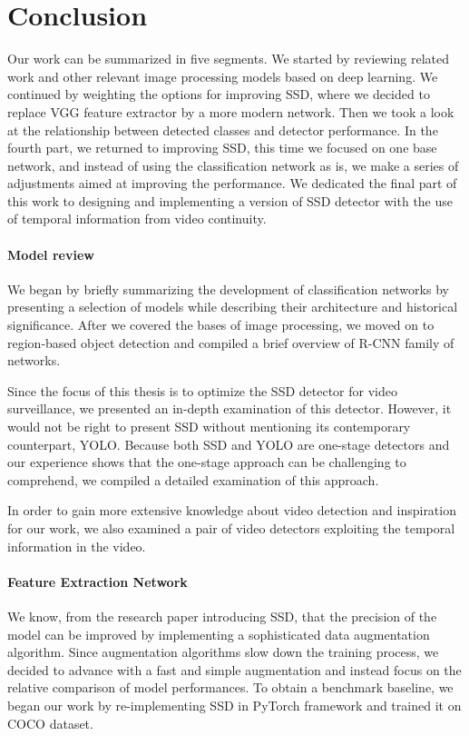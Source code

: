 \chapter*{Conclusion}

Our work can be summarized in five segments. We started by reviewing related work and other relevant image processing models based on deep learning. We continued by weighting the options for improving SSD, where we decided to replace VGG feature extractor by a more modern network. Then we took a look at the relationship between detected classes and detector performance. In the fourth part, we returned to improving SSD, this time we focused on one base network, and instead of using the classification network as is, we make a series of adjustments aimed at improving the performance. We dedicated the final part of this work to designing and implementing a version of SSD detector with the use of temporal information from video continuity.

\subsubsection*{Model review}
We began by briefly summarizing the development of classification networks by presenting a selection of models while describing their architecture and historical significance. After we covered the bases of image processing, we moved on to region-based object detection and compiled a brief overview of R-CNN family of networks.

Since the focus of this thesis is to optimize the SSD detector for video surveillance, we presented an in-depth examination of this detector. However, it would not be right to present SSD without mentioning its contemporary counterpart, YOLO. Because both SSD and YOLO are one-stage detectors and our experience shows that the one-stage approach can be challenging to comprehend, we compiled a detailed examination of this approach.

In order to gain more extensive knowledge about video detection and inspiration for our work, we also examined a pair of video detectors exploiting the temporal information in the video.

\subsubsection*{Feature Extraction Network}
We know, from the research paper introducing SSD, that the precision of the model can be improved by implementing a sophisticated data augmentation algorithm. Since augmentation algorithms slow down the training process, we decided to advance with a fast and simple augmentation and instead focus on the relative comparison of model performances. To obtain a benchmark baseline, we began our work by re-implementing SSD in PyTorch framework and trained it on COCO dataset.


